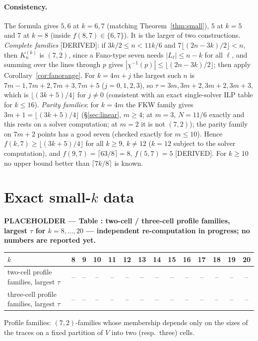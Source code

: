 \documentclass[11pt]{article}
\theoremstyle{definition}
\newcommand{\st}[1]{\textsf{\small[#1]}}
\begin{document}
\paragraph{Consistency.} The formula gives $5,6$ at $k=6,7$ (matching Theorem~\ref{thm:small}), $5$ at $k=5$ and $7$
at $k=8$ (inside $f(8,7)\in\{6,7\}$). It is the larger of two constructions. \emph{Complete families} \st{DERIVED}: if
$3k/2\le n<11k/6$ and $7\lfloor(2n-3k)/2\rfloor<n$, then $K^{(k)}_n$ is $(7,2)$, since a Fano-type seven needs
$|L_\ell|\le n-k$ for all $\ell$, and summing over the lines through $p$ gives $|\chi^{-1}(p)|\le\lfloor(2n-3k)/2\rfloor$;
then apply Corollary~\ref{cor:fanorange}. For $k=4m+j$ the largest such $n$ is $7m-1,7m+2,7m+3,7m+5$ ($j=0,1,2,3$), so
$\tau=3m,3m+2,3m+2,3m+3$, which is $\lfloor(3k+5)/4\rfloor$ for $j\ne0$ (consistent with an exact single-solver ILP table
for $k\le16$). \emph{Parity families}: for $k=4m$ the FKW family gives $3m+1=\lfloor(3k+5)/4\rfloor$ (\S\ref{sec:linear},
$m\ge4$; at $m=3$, $N=11/6$ exactly and this rests on a solver computation; at $m=2$ it is not $(7,2)$); the parity
family on $7m+2$ points has a good seven (checked exactly for $m\le10$). Hence $f(k,7)\ge\lfloor(3k+5)/4\rfloor$ for all
$k\ge9$, $k\ne12$ ($k=12$ subject to the solver computation), and $f(9,7)=\lceil63/8\rceil=8$, $f(5,7)=5$ \st{DERIVED}.
For $k\ge10$ no upper bound better than $\lceil7k/8\rceil$ is known.

\section{Exact small-\texorpdfstring{$k$}{k} data}\label{sec:tables}


\begin{center}\small
{}\label{tab:placeholder}
\textbf{PLACEHOLDER --- Table \thetable: two-cell / three-cell profile families, largest $\tau$ for $k=8,\dots,20$ ---
independent re-computation in progress; no numbers are reported yet.}\par\smallskip
\begin{tabular}{@{}l*{13}{c}@{}}
\toprule
$k$ & 8 & 9 & 10 & 11 & 12 & 13 & 14 & 15 & 16 & 17 & 18 & 19 & 20\\
\midrule
two-cell profile families, largest $\tau$ & -- & -- & -- & -- & -- & -- & -- & -- & -- & -- & -- & -- & --\\
three-cell profile families, largest $\tau$ & -- & -- & -- & -- & -- & -- & -- & -- & -- & -- & -- & -- & --\\
\bottomrule
\end{tabular}
\par\smallskip
\parbox{0.92\textwidth}{\small Profile families: $(7,2)$-families whose membership depends only on the sizes of the
traces on a fixed partition of $V$ into two (resp.\ three) cells.}
\end{center}
\end{document}
